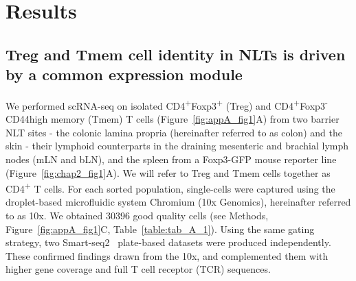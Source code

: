 
\section{Results}
\label{section2.2}
\subsection{Treg and Tmem cell identity in NLTs is driven by a common expression module}
\label{section2.2.1}
We performed scRNA-seq on isolated CD4\textsuperscript{+}Foxp3\textsuperscript{+} (Treg) and CD4\textsuperscript{+}Foxp3\textsuperscript{-}CD44high memory (Tmem) T cells (Figure~\ref{fig:appA_fig1}A) from two barrier NLT sites - the colonic lamina propria (hereinafter referred to as colon) and the skin - their lymphoid counterparts in the draining mesenteric and brachial lymph nodes (mLN and bLN), and the spleen from a Foxp3-GFP mouse reporter line~\citep{Bettelli2006-dw} (Figure~\ref{fig:chap2_fig1}A). We will refer to Treg and Tmem cells together as CD4\textsuperscript{+} T cells. For each sorted population, single-cells were captured using the droplet-based microfluidic system Chromium (10x Genomics), hereinafter referred to as 10x. We obtained 30396 good quality cells (see Methods, Figure~\ref{fig:appA_fig1}C, Table~\ref{table:tab_A_1}). Using the same gating strategy, two Smart-seq2~\citep{picelli_full-length_2014} plate-based datasets were produced independently. These confirmed findings drawn from the 10x, and complemented them with higher gene coverage and full T cell receptor (TCR) sequences.

